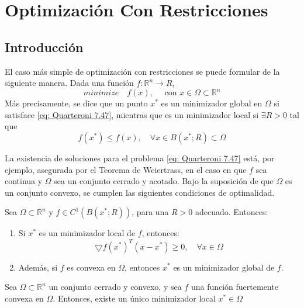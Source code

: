 \chapter{Optimización Con Restricciones}

\section{Introducción}

El caso más simple de optimización con restricciones se puede formular de la siguiente manera. Dada una función $f: \mathbb{R}^n \rightarrow R$,
\begin{equation}
    \label{eq: Quarteroni 7.47}
    minimize \quad f(x), \quad \text{ con } x \in \Omega \subset \mathbb{R}^n
\end{equation}
Más precisamente, se dice que un punto $x^*$ es un minimizador global en $\Omega$ si satisface \ref{eq: Quarteroni 7.47}, mientras que es un minimizador local si $\exists R > 0 $ tal que
\[ f(x^*) \leq f(x), \quad \forall x \in B(x^*; R) \subset \Omega \]

La existencia de soluciones para el problema \ref{eq: Quarteroni 7.47} está, por ejemplo, asegurada por el Teorema de Weiertrass, en el caso en que $f$ sea continua y $\Omega$ sea un conjunto cerrado y acotado. Bajo la suposición de que $\Omega$ es un conjunto convexo, se cumplen las siguientes condiciones de optimalidad.

\begin{property}
    Sea $\Omega \subset \mathbb{R}^n$ y $f \in C^1(B(x^*; R))$, para una $R > 0$ adecuado. Entonces:
    \begin{enumerate}
        \item Si $x^*$ es un minimizador local de $f$, entonces:
        \begin{equation}
            \bigtriangledown f(x^*)^T(x - x^*) \geq 0, \quad \forall x \in \Omega
        \end{equation}
        \item Además, si $f$ es convexa en $\Omega$, entonces $x^*$ es un minimizador global de $f$.
    \end{enumerate}
\end{property}

\begin{property}
    Sea $\Omega \subset \mathbb{R}^n$ un conjunto cerrado y convexo, y sea $f$ una función fuertemente convexa en $\Omega$. Entonces, existe un único minimizador local $x^* \in \Omega$
\end{property}

